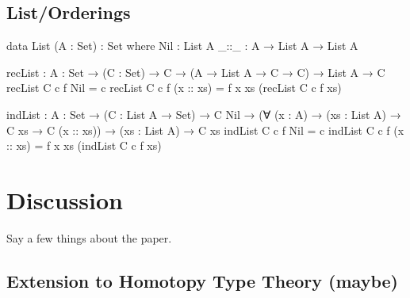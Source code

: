\documentclass[12pt]{article}
\begin{document}
\subsection*{List/Orderings}
\begin{center}
\begin{minipage}{0.9\textwidth}
\begin{code}
data List (A : Set) : Set where
  Nil  : List A
  _::_ : A → List A → List A

recList : {A : Set} → (C : Set) → C →
          (A → List A → C → C) → List A → C
recList C c f Nil = c
recList C c f (x :: xs) = f x xs (recList C c f xs)

indList : {A : Set} → (C : List A → Set) → C Nil →
          (∀ (x : A) → (xs : List A) → C xs → C (x :: xs)) →
          (xs : List A) → C xs
indList C c f Nil = c
indList C c f (x :: xs) = f x xs (indList C c f xs)
\end{code}
\end{minipage}
\end{center}

\section{Discussion}
Say a few things about the paper.

\subsection*{Extension to Homotopy Type Theory (maybe)}
\end{document}
